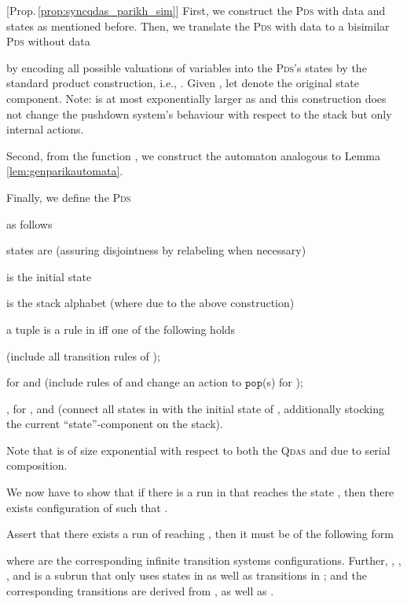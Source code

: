 \documentclass[runningheads,oribibl,]{article}
\newcommand{\Aa}{\ensuremath{\mathcal{A}}\xspace}
\newcommand{\cfont}[1]{\ensuremath{\mathtt{#1}}\xspace}
\newcommand{\pds}{\textsc{Pds}\xspace}
\newcommand{\qdas}{\textsc{Qdas}\xspace}
\newcommand{\pop}{\ensuremath{\cfont{pop}}}
\newenvironment{myitemize}{\begin{list}{\labelitemi}{\setlength{\topsep}{4pt}\setlength{\partopsep}{0pt}
\setlength{\itemsep}{0pt}
\setlength{\itemindent}{0ex}
\setlength{\listparindent}{0ex}
\setlength{\leftmargin}{4ex}\setlength{\labelwidth}{2ex}
}}
{\end{list}}
\newenvironment{proof}{\noindent{\it Proof.\hspace*{.5cm}}}{}
\begin{document}
\propsyncqdasparikhsim*
\begin{proof}[Prop.\,\ref{prop:syncqdas_parikh_sim}]
  First, we construct the \pds with data  and states 
  as mentioned before. Then, we
  translate the \pds with data to a bisimilar \pds without data
  
  by encoding all possible valuations of variables into the {\pds}'s states by the
  standard product construction, i.e.,
  . Given ,
  let  denote the original state component.
  Note:  is at most
  exponentially larger as  and  this construction does not change the
  pushdown system's behaviour with respect to the stack but only internal
  actions.

  Second, from the function , we construct the automaton
   analogous to
  Lemma\,\ref{lem:genparikautomata}.

  \newcommand{\Aaf}{{\Aa,f}}
  Finally, we define the \pds
  
  as follows
  \begin{myitemize}
    \item states are  (assuring
       disjointness by relabeling when necessary)
    \item  is the initial state
    \item  is the stack alphabet
      (where  due to the above construction)
    \item 
    \item a tuple  is a rule in  iff one of the following
      holds
      \begin{myitemize}
        \item  (include all transition rules of
          );
        \item  for  and  (include
          rules of  and change an  action to {\pop(s)} for );
        \item ,  for ,
          and  (connect all states in
           with the initial state of , additionally stocking
          the current ``state''-component on the stack).
      \end{myitemize}
  \end{myitemize}
  Note that  is of size exponential with respect to both the \qdas
  and  due to serial composition.

  We now have to show that if there is a run in  that reaches
  the state , then there exists configuration  of
   such that .

  Assert that there exists a run of  reaching , then
  it must be of the following form
  
  where  are the corresponding infinite
  transition systems configurations.
  Further, , , , and  is a
  subrun that only uses states in  as well as transitions in
  ;  and the corresponding
  transitions are derived from , as well as .


\end{proof}
\end{document}
